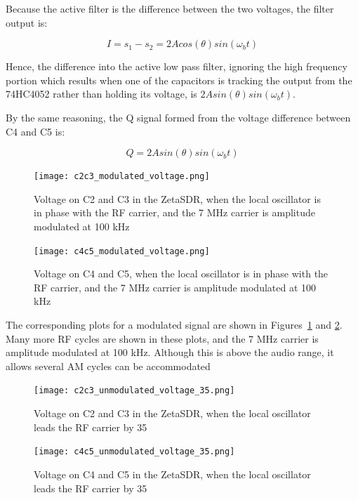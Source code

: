 \documentclass[11pt, twoside]{article}
\begin{document}
Because the active filter is the difference between the two voltages,
the filter output is:

\begin{equation}\label{eqn:tayloei}
  I = s_1 - s_2 = 2 A cos(\theta) sin({\omega_b}t)
\end{equation}

Hence, the difference into the active low pass filter, ignoring the
high frequency portion which results when one of the capacitors is
tracking the output from the 74HC4052 rather than holding its voltage,
is $2A sin(\theta) sin({\omega_b}t)$.

By the same reasoning, the Q signal formed from the voltage difference
between C4 and C5 is:

\begin{equation}\label{eqn:tayloeq}
  Q = 2 A sin(\theta) sin({\omega_b}t)
\end{equation}

\begin{figure}
  \center
  \captionsetup{width=.8\linewidth}
  \texttt{[image: c2c3\_modulated\_voltage.png]}
  \caption{Voltage on C2 and C3 in the ZetaSDR, when the local
    oscillator is in phase with the RF carrier, and the 7 MHz carrier
    is amplitude modulated at 100 kHz}
  \label{figure:C2C3mod}
\end{figure}

\begin{figure}
  \center
  \captionsetup{width=.8\linewidth}
  \texttt{[image: c4c5\_modulated\_voltage.png]}
  \caption{Voltage on C4 and C5, when the local oscillator is in phase
    with the RF carrier, and the 7 MHz carrier is amplitude modulated
    at 100 kHz}
  \label{figure:C4C5mod}
\end{figure}


The corresponding plots for a modulated signal are shown in
Figures~\ref{figure:C2C3mod} and \ref{figure:C4C5mod}. Many more RF
cycles are shown in these plots, and the 7 MHz carrier is amplitude
modulated at 100 kHz.  Although this is above the audio range, it
allows several AM cycles can be accommodated

\begin{figure}
  \center
  \captionsetup{width=.8\linewidth}
  \texttt{[image: c2c3\_unmodulated\_voltage\_35.png]}
  \caption{Voltage on C2 and C3 in the ZetaSDR, when the local
    oscillator leads the RF carrier by 35{\degree}}
  \label{figure:C2C3phase}
\end{figure}

\begin{figure}
  \center
  \captionsetup{width=.8\linewidth}
  \texttt{[image: c4c5\_unmodulated\_voltage\_35.png]}
  \caption{Voltage on C4 and C5 in the ZetaSDR, when the local
    oscillator leads the RF carrier by 35{\degree}}
  \label{figure:C4C5phase}
\end{figure}
\end{document}
